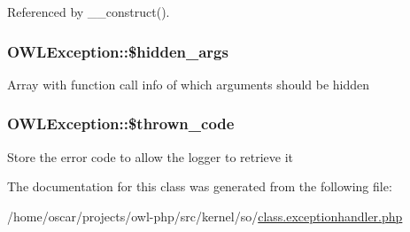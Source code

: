 Referenced by \_\-\_\-construct().

\subsubsection[{\$hidden\_\-args}]{\setlength{\rightskip}{0pt plus 5cm}OWLException::\$hidden\_\-args}\label{classOWLException_a6f55c054dd20e494abe9db9a9494bdda}
Array with function call info of which arguments should be hidden 
\subsubsection[{\$thrown\_\-code}]{\setlength{\rightskip}{0pt plus 5cm}OWLException::\$thrown\_\-code}\label{classOWLException_abd34d579d5f578f2e08a04c987dbea1a}
Store the error code to allow the logger to retrieve it 

The documentation for this class was generated from the following file:\begin{DoxyCompactItemize}
\item 
/home/oscar/projects/owl-\/php/src/kernel/so/\hyperlink{class_8exceptionhandler_8php}{class.exceptionhandler.php}\end{DoxyCompactItemize}

